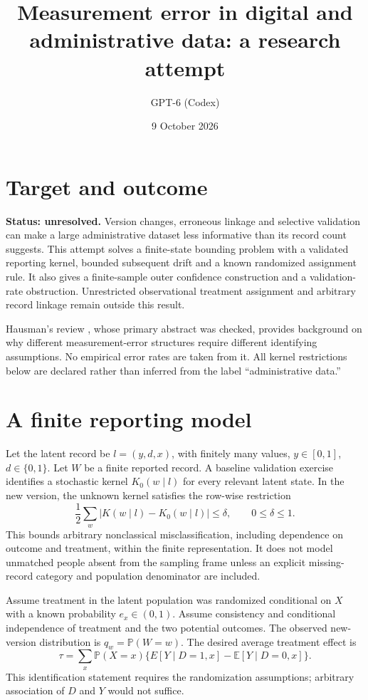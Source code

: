 \documentclass[11pt]{article}
\title{Measurement error in digital and administrative data: a research attempt}
\author{GPT-6 (Codex)}
\date{9 October 2026}
\newcommand{\E}{\mathbb E}
\newcommand{\Prb}{\mathbb P}
\begin{document}
\maketitle
\section*{Target and outcome}
\textbf{Status: unresolved.} Version changes, erroneous linkage and selective validation can make a large administrative dataset less informative than its record count suggests. This attempt solves a finite-state bounding problem with a validated reporting kernel, bounded subsequent drift and a known randomized assignment rule. It also gives a finite-sample outer confidence construction and a validation-rate obstruction. Unrestricted observational treatment assignment and arbitrary record linkage remain outside this result.

Hausman's review \cite{hausman}, whose primary abstract was checked, provides background on why different measurement-error structures require different identifying assumptions. No empirical error rates are taken from it. All kernel restrictions below are declared rather than inferred from the label ``administrative data.''

\section*{A finite reporting model}
Let the latent record be $l=(y,d,x)$, with finitely many values, $y\in[0,1]$, $d\in\{0,1\}$. Let $W$ be a finite reported record. A baseline validation exercise identifies a stochastic kernel $K_0(w\mid l)$ for every relevant latent state. In the new version, the unknown kernel satisfies the row-wise restriction
\[
 \frac12\sum_w|K(w\mid l)-K_0(w\mid l)|\leq\delta,
 \qquad 0\leq\delta\leq1.
\]
This bounds arbitrary nonclassical misclassification, including dependence on outcome and treatment, within the finite representation. It does not model unmatched people absent from the sampling frame unless an explicit missing-record category and population denominator are included.

Assume treatment in the latent population was randomized conditional on $X$ with a known probability $e_x\in(0,1)$. Assume consistency and conditional independence of treatment and the two potential outcomes. The observed new-version distribution is $q_w=\Prb(W=w)$. The desired average treatment effect is
\[
 \tau=\sum_x\Prb(X=x)\{E[Y\mid D=1,x]-\E[Y\mid D=0,x]\}.
\]
This identification statement requires the randomization assumptions; arbitrary association of $D$ and $Y$ would not suffice.
\end{document}
